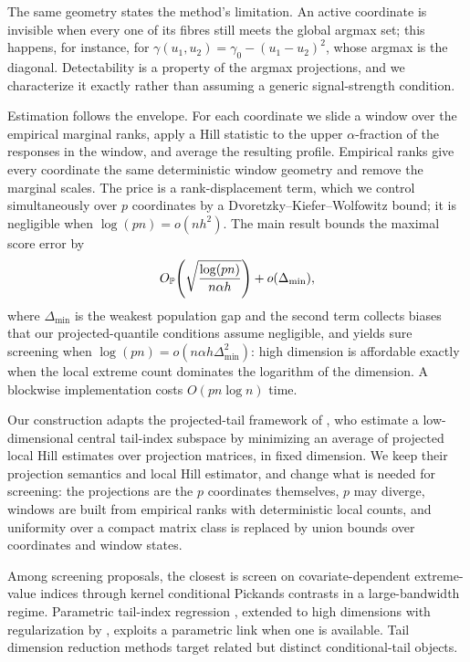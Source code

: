 The same geometry states the method's limitation. An active coordinate is
invisible when every one of its fibres still meets the global argmax set;
this happens, for instance, for $\gamma(u_1,u_2)=\gamma_0-(u_1-u_2)^2$,
whose argmax is the diagonal. Detectability is a property of the argmax
projections, and we characterize it exactly rather than assuming a generic
signal-strength condition.

Estimation follows the envelope. For each coordinate we slide a window over
the empirical marginal ranks, apply a Hill statistic to the upper
$\alpha$-fraction of the responses in the window, and average the resulting
profile. Empirical ranks give every coordinate the same deterministic window
geometry and remove the marginal scales. The price is a rank-displacement
term, which we control simultaneously over $p$ coordinates by a
Dvoretzky--Kiefer--Wolfowitz bound; it is negligible when $\log(pn)=o(nh^2)$.
The main result bounds the maximal score error by
\[
 O_{\mathbb P}\!\left(\sqrt{\frac{\log(pn)}{n\alpha h}}\right)+o(\Delta_{\min}),
\]
where $\Delta_{\min}$ is the weakest population gap and the second term
collects biases that our projected-quantile conditions assume
negligible, and yields sure screening when
$\log(pn)=o(n\alpha h\Delta_{\min}^2)$: high dimension is affordable
exactly when the local extreme count dominates the logarithm of the
dimension. A blockwise implementation costs $O(pn\log n)$ time.

Our construction adapts the projected-tail framework of
\citet{gardesPodgorny2025}, who estimate a low-dimensional central tail-index
subspace by minimizing an average of projected local Hill estimates over
projection matrices, in fixed dimension. We keep their projection semantics
and local Hill estimator, and change what is needed for screening: the
projections are the $p$ coordinates themselves, $p$ may diverge, windows are
built from empirical ranks with deterministic local counts, and uniformity
over a compact matrix class is replaced by union bounds over coordinates and
window states. 

Among screening
proposals, the closest is \citet{yoshidaUmezu2026} screen on covariate-dependent
extreme-value indices through kernel conditional Pickands contrasts in a
large-bandwidth regime. Parametric tail-index regression \citep{wangTsai2009}, extended to
high dimensions with regularization by \citet{sasakiTaoWang2026},
exploits a parametric link when one is available. Tail dimension reduction methods
\citep{gardes2018,aghbalouEtAl2024,bousebataEtAl2023,arbelEtAl2024} target
related but distinct conditional-tail objects. 

